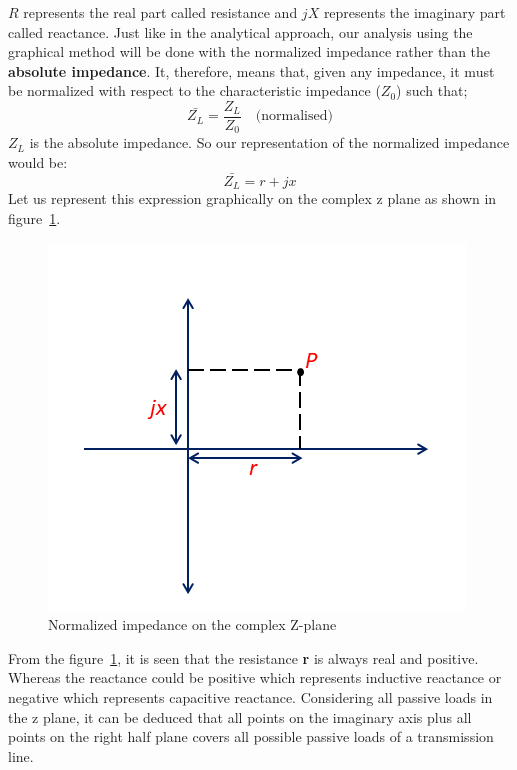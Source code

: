 $R$ represents the real part called resistance and $jX$ represents the imaginary part called reactance. Just like in the analytical approach, our analysis using the graphical method will be done with the normalized impedance rather than the \textbf{absolute impedance}. It, therefore, means that, given any impedance, it must be normalized with respect to the characteristic impedance ($Z_0$) such that;
\begin{equation*}
\bar{Z_L}=\frac{Z_L}{Z_0} \quad \text{(normalised)}
\end{equation*}
$Z_L$ is the absolute impedance. So our representation of the normalized impedance would be:
\begin{equation*}
\bar{Z_L}= r + jx
\end{equation*}
Let us represent this expression graphically on the complex z plane as shown in figure~\ref{fig:transline2}.
\begin{figure}[h]
\center\includegraphics[width=0.8\linewidth]{graphics/Zplane}
\caption{Normalized impedance on the complex Z-plane}
\label{fig:transline2}
\end{figure}

From the figure~\ref{fig:transline2}, it is seen that the resistance \textbf{r} is always real and positive. Whereas the reactance could be positive which represents inductive reactance or negative which represents capacitive reactance. Considering all passive loads in the z plane, it can be deduced that all points on the imaginary axis plus all points on the right half plane covers all possible passive loads of a transmission line.

